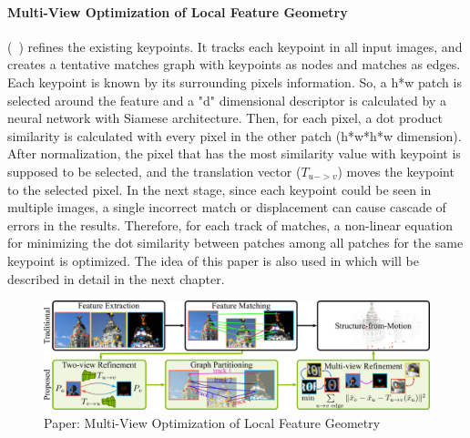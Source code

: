 \documentclass[11pt]{article}
\begin{document}
    \paragraph{Multi-View Optimization of Local Feature Geometry} (~\cite{Dusmanu2020Multi}) refines the existing keypoints. It tracks each keypoint in all input images, and creates a tentative
    matches graph with keypoints as nodes and matches as edges. Each keypoint is known by its surrounding pixels
    information. So, a h*w patch is selected around the feature and a "d" dimensional descriptor is calculated by
    a neural network with Siamese architecture. Then, for each pixel, a dot product similarity is calculated
    with every pixel in the other patch (h*w*h*w dimension). After normalization, the pixel that has the most
    similarity value with keypoint is supposed to be selected, and the translation vector ($T_{u->v}$)
    moves the keypoint to the selected pixel. In the next stage, since each keypoint could be seen in multiple images,
    a single incorrect match or displacement can cause cascade of errors in the results. Therefore, for each track of
    matches, a non-linear equation for minimizing the dot similarity between patches among all patches for the same
    keypoint is optimized. The idea of this paper is also used in \cite{lindenberger2021pixsfm} which will be
    described in detail in the next chapter.

    \begin{figure}
    \centering
    \includegraphics[width=\textwidth,height=\textheight,keepaspectratio]{images/dusmano.jpg}
    \caption{Paper: Multi-View Optimization of Local Feature Geometry}
    \end{figure}
\end{document}
